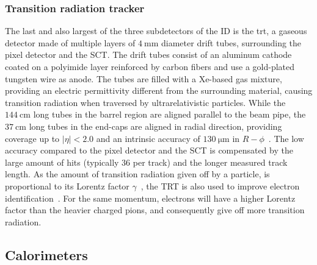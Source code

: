 \subsubsection{Transition radiation tracker}

The last and also largest of the three subdetectors of the ID is the \gls{trt}, a gaseous detector made of multiple layers of $\SI{4}{\milli\meter}$ diameter drift tubes, surrounding the pixel detector and the SCT. The drift tubes consist of an aluminum cathode coated on a polyimide layer reinforced by carbon fibers and use a gold-plated tungsten wire as anode. The tubes are filled with a Xe-based gas mixture, providing an electric permittivity different from the surrounding material, causing transition radiation when traversed by ultrarelativistic particles. While the $\SI{144}{\centi\meter}$ long tubes in the barrel region are aligned parallel to the beam pipe, the $\SI{37}{\centi\meter}$ long tubes in the end-caps are aligned in radial direction, providing coverage up to $\vert\eta\vert <2.0$ and an intrinsic accuracy of $\SI{130}{\micro\meter}$ in $R-\phi$~\cite{Aad:2008zzm}. The low accuracy compared to the pixel detector and the SCT is compensated by the large amount of hits (typically $36$ per track) and the longer measured track length. As the amount of transition radiation given off by a particle, is proportional to its Lorentz factor $\gamma$~\cite{pdg2020}, the TRT is also used to improve electron identification~\cite{ATLAS-CONF-2011-128}. For the same momentum, electrons will have a higher Lorentz factor than the heavier charged pions, and consequently give off more transition radiation.

\subsection{Calorimeters}


